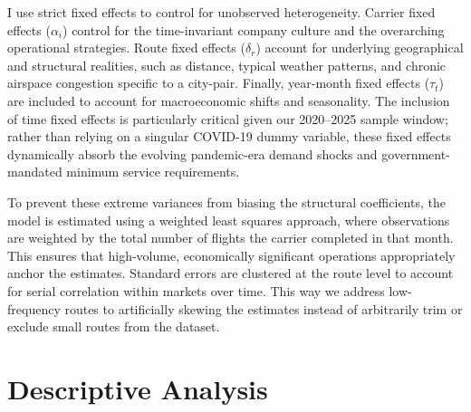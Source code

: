 \documentclass[preprint,12pt,authoryear]{elsarticle}
\begin{document}
\vspace{0.5cm}


I use strict fixed effects to control for unobserved heterogeneity. Carrier fixed effects ($\alpha_i$) control for the time-invariant company culture and the overarching operational strategies. Route fixed effects ($\delta_r$) account for underlying geographical and structural realities, such as distance, typical weather patterns, and chronic airspace congestion specific to a city-pair. Finally, year-month fixed effects ($\tau_t$) are included to account for macroeconomic shifts and seasonality. The inclusion of time fixed effects is particularly critical given our 2020–2025 sample window; rather than relying on a singular COVID-19 dummy variable, these fixed effects dynamically absorb the evolving pandemic-era demand shocks and government-mandated minimum service requirements.

To prevent these extreme variances from biasing the structural coefficients, the model is estimated using a weighted least squares approach, where observations are weighted by the total number of flights the carrier completed in that month. This ensures that high-volume, economically significant operations appropriately anchor the estimates. Standard errors are clustered at the route level to account for serial correlation within markets over time. This way we address low-frequency routes to artificially skewing the estimates instead of arbitrarily trim or exclude small routes from the dataset. 

\section{Descriptive Analysis}
\end{document}
